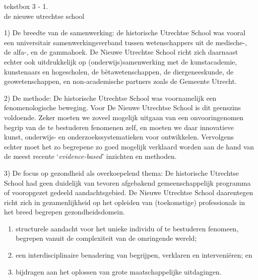 \documentclass{jote-book}
\begin{document}
\begin{bookbox}{\raggedright tekstbox 3 - 1. \\de nieuwe utrechtse school}
		1) De breedte van de samenwerking: de historische Utrechtse School was vooral een universitair samenwerkingsverband tussen wetenschappers uit de medische-, de alfa-, en de gammahoek. De Nieuwe Utrechtse School richt zich daarnaast echter ook uitdrukkelijk op (onderwijs)samenwerking met de kunstacademie, kunstenaars en hogescholen, de bètawetenschappen, de diergeneeskunde, de geowetenschappen, en non-academische partners zoals de Gemeente Utrecht.

		\vspace*{\baselineskip}

		2) De methode: De historische Utrechtse School was voornamelijk een fenomenologische beweging. Voor De Nieuwe Utrechtse School is dit geenszins voldoende. Zeker moeten we zoveel mogelijk uitgaan van een onvooringenomen begrip van de te bestuderen fenomenen zelf, en moeten we daar innovatieve kunst, onderwijs- en onderzoekssystematieken voor ontwikkelen. Vervolgens echter moet het zo begrepene zo goed mogelijk verklaard worden aan de hand van de meest recente ‘\emph{evidence-based}' inzichten en methoden.

		\vspace*{\baselineskip}

		3) De focus op gezondheid als overkoepelend thema: De historische Utrechtse School had geen duidelijk van tevoren afgebakend gemeenschappelijk programma of vooropgezet gedeeld aandachtsgebied. De Nieuwe Utrechtse School daarentegen richt zich in gezamenlijkheid op het opleiden van (toekomstige) professionals in het breed begrepen gezondheidsdomein.
	\end{bookbox}
	\begin{enumerate}


		\item structurele aandacht voor het unieke individu of te bestuderen fenomeen, begrepen vanuit de complexiteit van de omringende wereld;



		\item een interdisciplinaire benadering van begrijpen, verklaren en interveniëren; en



		\item bijdragen aan het oplossen van grote maatschappelijke uitdagingen.


	\end{enumerate}
\end{document}

